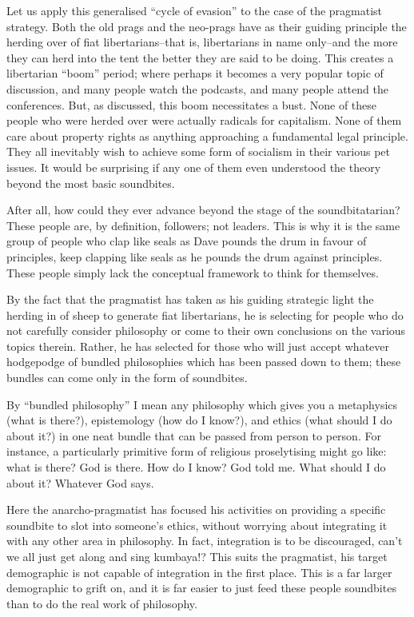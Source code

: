 \documentclass[11pt]{article}
\begin{document}
Let us apply this generalised ``cycle of evasion'' to the case of the pragmatist strategy. Both the old prags and the neo-prags have as their guiding principle the herding over of fiat libertarians--that is, libertarians in name only--and the more they can herd into the tent the better they are said to be doing. This creates a libertarian ``boom'' period; where perhaps it becomes a very popular topic of discussion, and many people watch the podcasts, and many people attend the conferences. But, as discussed, this boom necessitates a bust. None of these people who were herded over were actually radicals for capitalism. None of them care about property rights as anything approaching a fundamental legal principle. They all inevitably wish to achieve some form of socialism in their various pet issues. It would be surprising if any one of them even understood the theory beyond the most basic soundbites.

After all, how could they ever advance beyond the stage of the soundbitatarian? These people are, by definition, followers; not leaders. This is why it is the same group of people who clap like seals as Dave pounds the drum in favour of principles, keep clapping like seals as he pounds the drum against principles. These people simply lack the conceptual framework to think for themselves.

By the fact that the pragmatist has taken as his guiding strategic light the herding in of sheep to generate fiat libertarians, he is selecting for people who do not carefully consider philosophy or come to their own conclusions on the various topics therein. Rather, he has selected for those who will just accept whatever hodgepodge of bundled philosophies which has been passed down to them; these bundles can come only in the form of soundbites.

By ``bundled philosophy'' I mean any philosophy which gives you a metaphysics (what is there?), epistemology (how do I know?), and ethics (what should I do about it?) in one neat bundle that can be passed from person to person. For instance, a particularly primitive form of religious proselytising might go like: what is there? God is there. How do I know? God told me. What should I do about it? Whatever God says.

Here the anarcho-pragmatist has focused his activities on providing a specific soundbite to slot into someone's ethics, without worrying about integrating it with any other area in philosophy. In fact, integration is to be discouraged, can't we all just get along and sing kumbaya!? This suits the pragmatist, his target demographic is not capable of integration in the first place. This is a far larger demographic to grift on, and it is far easier to just feed these people soundbites than to do the real work of philosophy.
\end{document}

